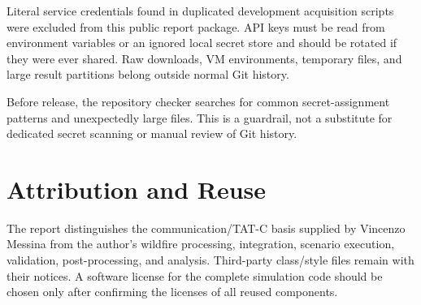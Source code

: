 Literal service credentials found in duplicated development acquisition scripts were excluded from this public report package. API keys must be read from environment variables or an ignored local secret store and should be rotated if they were ever shared. Raw downloads, VM environments, temporary files, and large result partitions belong outside normal Git history.

Before release, the repository checker searches for common secret-assignment patterns and unexpectedly large files. This is a guardrail, not a substitute for dedicated secret scanning or manual review of Git history.

\section{Attribution and Reuse}

The report distinguishes the communication/TAT-C basis supplied by Vincenzo Messina from the author's wildfire processing, integration, scenario execution, validation, post-processing, and analysis. Third-party class/style files remain with their notices. A software license for the complete simulation code should be chosen only after confirming the licenses of all reused components.

